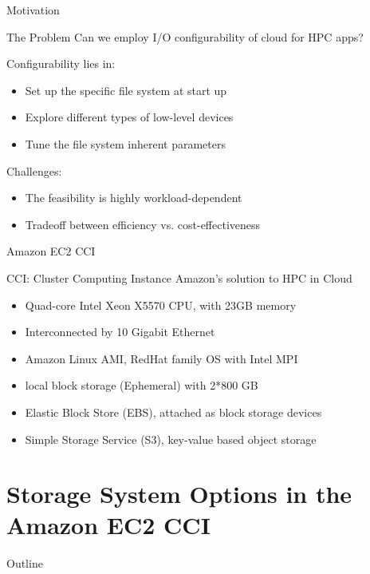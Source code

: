 \documentclass{beamer}
\begin{document}
\begin{frame}{Motivation}
    \begin{block}{The Problem}
        Can we employ I/O configurability of cloud for HPC apps?
    \end{block}
    \pause
    {\huge\smiley} Configurability lies in:
    \begin{itemize}
            \item Set up the specific file system at start up
            \item Explore different types of low-level devices
            \item Tune the file system inherent parameters
    \end{itemize}
    \pause
    {\huge\frownie} Challenges:
    \begin{itemize}
        \item The feasibility is highly workload-dependent
        \item Tradeoff between efficiency vs. cost-effectiveness
    \end{itemize}
\end{frame}

\begin{frame}{Amazon EC2 CCI}
    \begin{exampleblock}{CCI: Cluster Computing Instance}
        Amazon's solution to HPC in Cloud
    \end{exampleblock}
    \begin{itemize}
        \item Quad-core Intel Xeon X5570 CPU, with 23GB memory
        \item Interconnected by 10 Gigabit Ethernet
        \item Amazon Linux AMI, RedHat family OS with Intel MPI
        \item local block storage (Ephemeral) with 2*800 GB
        \item Elastic Block Store (EBS), attached as block storage devices
        \item Simple Storage Service (S3), key-value based object storage
    \end{itemize}
\end{frame}

\section{Storage System Options in the Amazon EC2 CCI}
\begin{frame}{Outline}
    \tableofcontents[current]
\end{frame}
\end{document}
